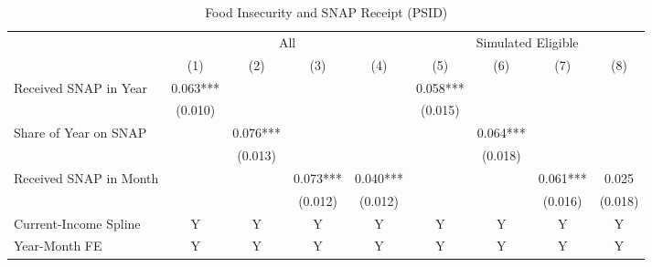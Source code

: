 \begin{table}[]
    \centering
     \caption{Food Insecurity and SNAP Receipt (PSID)}
    \label{tab:snap_by_month}
\begin{tabular*}{1.36\textwidth}{@{\extracolsep{\fill}}lcccccccc}
\toprule
                       & \multicolumn{4}{c}{All}                                                                   & \multicolumn{4}{c}{Simulated Eligible}                                                    \\ \cmidrule{2-5}\cmidrule{6-9}
                       & (1)                  & (2)                  & (3)                  & (4)                  & (5)                  & (6)                  & (7)                  & (8)                  \\ \midrule \addlinespace
Received SNAP in Year  & 0.063*** &                      &                      &                      & 0.058*** &                      &                      &                      \\
                       & (0.010)     &                      &                      &                      & (0.015)     &                      &                      &                      \\
Share of Year on SNAP  &                      & 0.076*** &                      &                      &                      & 0.064*** &                      &                      \\
                       &                      & (0.013)     &                      &                      &                      & (0.018)     &                      &                      \\
Received SNAP in Month &                      &                      & 0.073*** & 0.040*** &                      &                      & 0.061*** & 0.025 \\
                       &                      &                      & (0.012)     & (0.012)     &                      &                      & (0.016)     & (0.018)     \\ \addlinespace \midrule
                       Current-Income Spline  & Y                    & Y                    & Y                    & Y                    & Y                    & Y                    & Y                    & Y     \\
                       Year-Month FE          & Y                    & Y                    & Y                    & Y                    & Y                    & Y                    & Y                    & Y                    \\

\end{tabular*}
\end{table}
